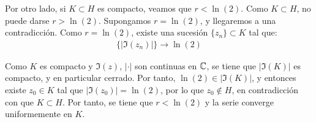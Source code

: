 \begin{ejercicio}
    Por otro lado, si $K\subset H$ es compacto, veamos que $r<\ln(2)$. Como $K\subset H$, no puede darse $r>\ln(2)$. Supongamos $r=\ln(2)$, y llegaremos a una contradicción. Como $r=\ln(2)$, existe una sucesión $\{z_n\}\subset K$ tal que:
    \begin{align*}
        \{|\Im(z_n)|\}\to \ln(2)
    \end{align*}

    Como $K$ es compacto y $\Im(z)$, $|\cdot|$ son continuas en $\mathbb{C}$, se tiene que $|\Im(K)|$ es compacto, y en particular cerrado. Por tanto, $\ln(2)\in |\Im(K)|$, y entonces existe $z_0\in K$ tal que $|\Im(z_0)|=\ln(2)$, por lo que $z_0\notin H$, en contradicción con que $K\subset H$. Por tanto, se tiene que $r<\ln(2)$ y la serie converge uniformemente en $K$.
\end{ejercicio}

